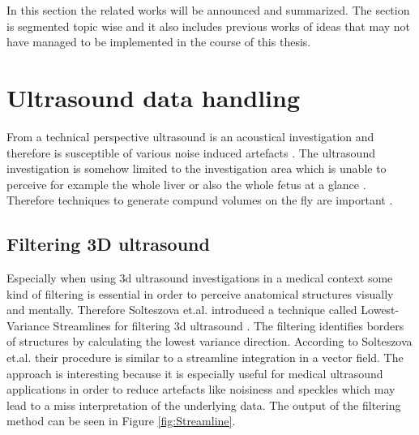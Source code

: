 
In this section the related works will be announced and summarized. The section is segmented topic wise and it also includes previous works of ideas that may not have managed to be implemented in the course of this thesis.

\section{Ultrasound data handling}

From a technical perspective ultrasound is an acoustical investigation and therefore is susceptible of various noise induced artefacts \cite{Solteszova2012}. The ultrasound investigation is somehow limited to the investigation area which is unable to perceive for example the whole liver or also the whole fetus at a glance \cite{Viola2013}. Therefore techniques to generate compund volumes on the fly are important \cite{Viola2013,Muller2014}. 

\subsection{Filtering 3D ultrasound}

Especially when using \gls{3d} ultrasound investigations in a medical context some kind of filtering is essential in order to perceive anatomical structures visually and mentally. Therefore Solteszova et.al. introduced a technique called Lowest-Variance Streamlines for filtering \gls{3d} ultrasound \cite{Solteszova2012}. The filtering identifies borders of structures by calculating the lowest variance direction. According to Solteszova et.al. their procedure is similar to a streamline integration in a vector field. The approach is interesting because it is especially useful for medical ultrasound applications in order to reduce artefacts like noisiness and speckles which may lead to a miss interpretation of the underlying data. The output of the filtering method can be seen in Figure \ref{fig:Streamline}.

